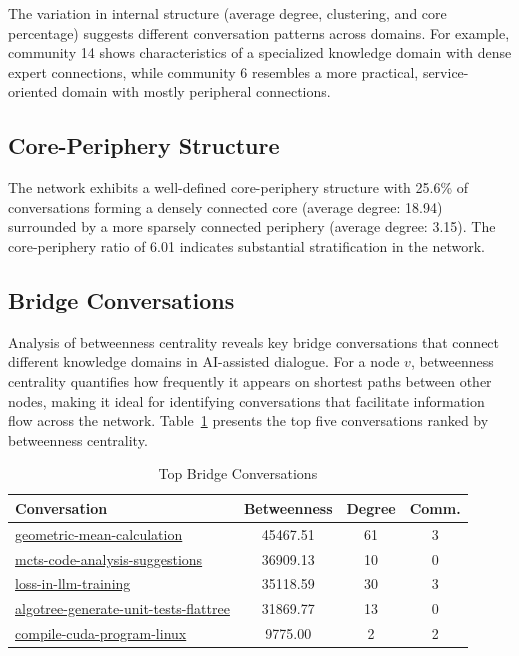 \documentclass[10pt, a4paper]{article}
\begin{document}
The variation in internal structure (average degree, clustering, and core percentage) suggests different conversation patterns across domains. For example, community 14 shows characteristics of a specialized knowledge domain with dense expert connections, while community 6 resembles a more practical, service-oriented domain with mostly peripheral connections.

\subsection{Core-Periphery Structure}

The network exhibits a well-defined core-periphery structure with 25.6\% of conversations forming a densely connected core (average degree: 18.94) surrounded by a more sparsely connected periphery (average degree: 3.15). The core-periphery ratio of 6.01 indicates substantial stratification in the network.

\subsection{Bridge Conversations}

Analysis of betweenness centrality reveals key bridge conversations that connect different knowledge domains in AI-assisted dialogue. For a node $v$, betweenness centrality quantifies how frequently it appears on shortest paths between other nodes, making it ideal for identifying conversations that facilitate information flow across the network. Table~\ref{tab:bridges} presents the top five conversations ranked by betweenness centrality.

\begin{table}
\centering
\caption{Top Bridge Conversations}
\label{tab:bridges}
\begin{tabular}{p{3.75cm}ccc}
\toprule
\textbf{Conversation} & \textbf{Betweenness} & \textbf{Degree} & \textbf{Comm.} \\
\midrule
\url{geometric-mean-calculation} & 45467.51 & 61 & 3 \\
\url{mcts-code-analysis-suggestions} & 36909.13 & 10 & 0 \\
\url{loss-in-llm-training} & 35118.59 & 30 & 3 \\
\url{algotree-generate-unit-tests-flattree} & 31869.77 & 13 & 0 \\
\url{compile-cuda-program-linux} & 9775.00 & 2 & 2 \\
\bottomrule
\end{tabular}
\end{table}
\end{document}
